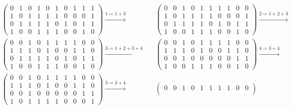 \documentclass{article}
\begin{document}
\begin{align*}
    &\begin{pmatrix}
        0 & 1 & 0 & 1 & 0 & 1 & 0 & 1 & 1 & 1 \\
        1 & 0 & 1 & 1 & 1 & 1 & 0 & 0 & 0 & 1 \\
        0 & 1 & 1 & 1 & 1 & 0 & 1 & 0 & 1 & 1 \\
        1 & 0 & 0 & 1 & 1 & 1 & 0 & 0 & 1 & 0
    \end{pmatrix}
    \xrightarrow{1\coloneqq1+3}
    &&\begin{pmatrix}
        0 & 0 & 1 & 0 & 1 & 1 & 1 & 1 & 0 & 0 \\
        1 & 0 & 1 & 1 & 1 & 1 & 0 & 0 & 0 & 1 \\
        0 & 1 & 1 & 1 & 1 & 0 & 1 & 0 & 1 & 1 \\
        1 & 0 & 0 & 1 & 1 & 1 & 0 & 0 & 1 & 0
    \end{pmatrix}
    \xrightarrow{2\coloneqq1+2+3}\\
    &\begin{pmatrix}
        0 & 0 & 1 & 0 & 1 & 1 & 1 & 1 & 0 & 0 \\
        1 & 1 & 1 & 0 & 1 & 0 & 0 & 1 & 1 & 0 \\
        0 & 1 & 1 & 1 & 1 & 0 & 1 & 0 & 1 & 1 \\
        1 & 0 & 0 & 1 & 1 & 1 & 0 & 0 & 1 & 0
    \end{pmatrix}
    \xrightarrow{3\coloneqq1+2+3+4}
    &&\begin{pmatrix}
        0 & 0 & 1 & 0 & 1 & 1 & 1 & 1 & 0 & 0 \\
        1 & 1 & 1 & 0 & 1 & 0 & 0 & 1 & 1 & 0 \\
        0 & 0 & 1 & 0 & 0 & 0 & 0 & 0 & 1 & 1 \\
        1 & 0 & 0 & 1 & 1 & 1 & 0 & 0 & 1 & 0
    \end{pmatrix}
    \xrightarrow{4\coloneqq3+4}\\
    &\begin{pmatrix}
        0 & 0 & 1 & 0 & 1 & 1 & 1 & 1 & 0 & 0 \\
        1 & 1 & 1 & 0 & 1 & 0 & 0 & 1 & 1 & 0 \\
        0 & 0 & 1 & 0 & 0 & 0 & 0 & 0 & 1 & 1 \\
        1 & 0 & 1 & 1 & 1 & 1 & 0 & 0 & 0 & 1
    \end{pmatrix}
    \xrightarrow{3\coloneqq3+4}
    &&\begin{pmatrix}
        0 & 0 & 1 & 0 & 1 & 1 & 1 & 1 & 0 & 0 \\

\end{pmatrix}
\end{align*}
\end{document}
